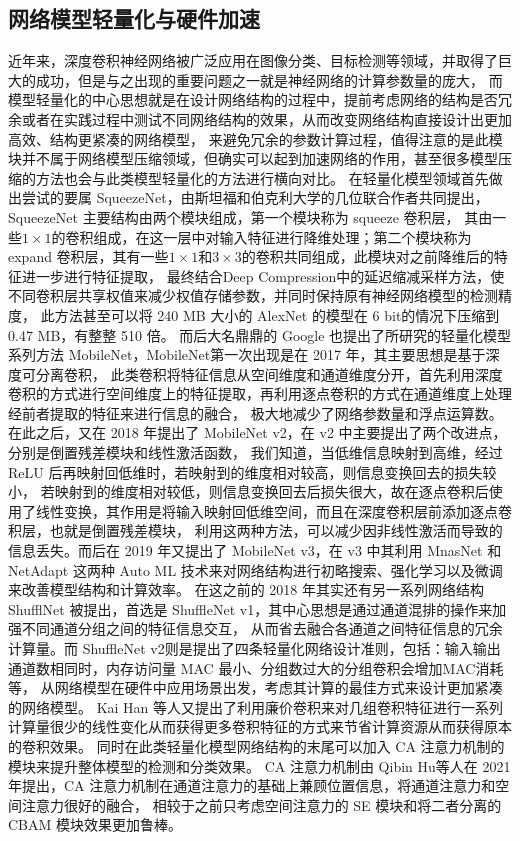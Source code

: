 \subsection{网络模型轻量化与硬件加速}
近年来，深度卷积神经网络被广泛应用在图像分类、目标检测等领域，并取得了巨大的成功，但是与之出现的重要问题之一就是神经网络的计算参数量的庞大，
而模型轻量化的中心思想就是在设计网络结构的过程中，提前考虑网络的结构是否冗余或者在实践过程中测试不同网络结构的效果，从而改变网络结构直接设计出更加高效、结构更紧凑的网络模型，
来避免冗余的参数计算过程，值得注意的是此模块并不属于网络模型压缩领域，但确实可以起到加速网络的作用，甚至很多模型压缩的方法也会与此类模型轻量化的方法进行横向对比。
在轻量化模型领域首先做出尝试的要属 SqueezeNet\cite{74}，由斯坦福和伯克利大学的几位联合作者共同提出，SqueezeNet 主要结构由两个模块组成，第一个模块称为 squeeze 卷积层，
其由一些$1 \times 1$的卷积组成，在这一层中对输入特征进行降维处理；第二个模块称为 expand 卷积层，其有一些$1 \times 1$和$3 \times 3$的卷积共同组成，此模块对之前降维后的特征进一步进行特征提取，
最终结合Deep Compression\cite{75}中的延迟缩减采样方法，使不同卷积层共享权值来减少权值存储参数，并同时保持原有神经网络模型的检测精度，
此方法甚至可以将 240 MB 大小的 AlexNet 的模型在 6 bit的情况下压缩到 0.47 MB，有整整 510 倍。
而后大名鼎鼎的 Google 也提出了所研究的轻量化模型系列方法 MobileNet，MobileNet第一次出现是在 2017 年，其主要思想是基于深度可分离卷积\cite{76}，
此类卷积将特征信息从空间维度和通道维度分开，首先利用深度卷积的方式进行空间维度上的特征提取，再利用逐点卷积的方式在通道维度上处理经前者提取的特征来进行信息的融合，
极大地减少了网络参数量和浮点运算数。在此之后，又在 2018 年提出了 MobileNet v2，在 v2 中主要提出了两个改进点，分别是倒置残差模块和线性激活函数\cite{77}，
我们知道，当低维信息映射到高维，经过 ReLU 后再映射回低维时，若映射到的维度相对较高，则信息变换回去的损失较小，
若映射到的维度相对较低，则信息变换回去后损失很大，故在逐点卷积后使用了线性变换，其作用是将输入映射回低维空间，而且在深度卷积层前添加逐点卷积层，也就是倒置残差模块，
利用这两种方法，可以减少因非线性激活而导致的信息丢失。而后在 2019 年又提出了 MobileNet v3，在 v3 中其利用 MnasNet 和 NetAdapt\cite{78}
这两种 Auto ML 技术来对网络结构进行初略搜索、强化学习以及微调来改善模型结构和计算效率。
在这之前的 2018 年其实还有另一系列网络结构 ShufflNet 被提出，首选是 ShuffleNet v1\cite{79}，其中心思想是通过通道混排的操作来加强不同通道分组之间的特征信息交互，
从而省去融合各通道之间特征信息的冗余计算量。而 ShuffleNet v2\cite{80}则是提出了四条轻量化网络设计准则，包括：输入输出通道数相同时，内存访问量 MAC 最小、分组数过大的分组卷积会增加MAC消耗等，
从网络模型在硬件中应用场景出发，考虑其计算的最佳方式来设计更加紧凑的网络模型。
Kai Han 等人又提出了利用廉价卷积\cite{81}来对几组卷积特征进行一系列计算量很少的线性变化从而获得更多卷积特征的方式来节省计算资源从而获得原本的卷积效果。
同时在此类轻量化模型网络结构的末尾可以加入 CA 注意力机制的模块来提升整体模型的检测和分类效果。
CA 注意力机制由 Qibin Hu等人\cite{82}在 2021 年提出，CA 注意力机制在通道注意力的基础上兼顾位置信息，将通道注意力和空间注意力很好的融合，
相较于之前只考虑空间注意力的 SE 模块和将二者分离的 CBAM 模块效果更加鲁棒。

